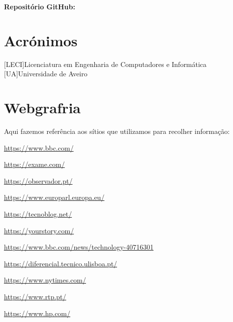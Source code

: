 \documentclass{report}
\begin{document}
\vspace{10pt}
\textbf{Repositório GitHub:} \repo

\chapter*{Acrónimos}
\begin{acronym}
[LECI]{Licenciatura em Engenharia de Computadores e Informática}
[UA]{Universidade de Aveiro}
\end{acronym}

\chapter*{Webgrafria}
\label{webgrafia}

Aqui fazemos referência aos sítios que
utilizamos para recolher informação:

\vspace{20pt}

\url{https://www.bbc.com/}
\vspace{10pt}

\url{https://exame.com/}
\vspace{10pt}

\url{https://observador.pt/}
\vspace{10pt}

\url{https://www.europarl.europa.eu/}
\vspace{10pt}

\url{https://tecnoblog.net/}
\vspace{10pt}

\url{ https://yourstory.com/}
\vspace{10pt}

\url{https://www.bbc.com/news/technology-40716301}
\vspace{10pt}

\url{https://diferencial.tecnico.ulisboa.pt/}
\vspace{10pt}

\url{https://www.nytimes.com/}
\vspace{10pt}

\url{https://www.rtp.pt/}
\vspace{10pt}

\url{https://www.hp.com/}

\clearpage

\printbibliography
\label{bibliografia}
\end{document}
